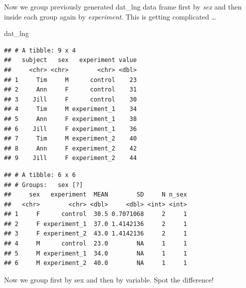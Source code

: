 \documentclass[]{book}
\newenvironment{Shaded}{\begin{snugshade}}{\end{snugshade}}
\newcommand{\KeywordTok}[1]{\textcolor[rgb]{0.13,0.29,0.53}{\textbf{#1}}}
\newcommand{\DataTypeTok}[1]{\textcolor[rgb]{0.13,0.29,0.53}{#1}}
\newcommand{\StringTok}[1]{\textcolor[rgb]{0.31,0.60,0.02}{#1}}
\newcommand{\OperatorTok}[1]{\textcolor[rgb]{0.81,0.36,0.00}{\textbf{#1}}}
\newcommand{\NormalTok}[1]{#1}
\begin{document}
Now we group previously generated dat\_lng data frame first by
\emph{sex} and then inside each group again by \emph{experiment}. This
is getting complicated \ldots{}

\begin{Shaded}
\begin{Highlighting}[]
\NormalTok{dat_lng}
\end{Highlighting}
\end{Shaded}

\begin{verbatim}
## # A tibble: 9 x 4
##   subject   sex   experiment value
##     <chr> <chr>        <chr> <dbl>
## 1     Tim     M      control    23
## 2     Ann     F      control    31
## 3    Jill     F      control    30
## 4     Tim     M experiment_1    34
## 5     Ann     F experiment_1    38
## 6    Jill     F experiment_1    36
## 7     Tim     M experiment_2    40
## 8     Ann     F experiment_2    42
## 9    Jill     F experiment_2    44
\end{verbatim}

\begin{Shaded}
\end{Shaded}

\begin{verbatim}
## # A tibble: 6 x 6
## # Groups:   sex [?]
##     sex   experiment  MEAN        SD     N n_sex
##   <chr>        <chr> <dbl>     <dbl> <int> <int>
## 1     F      control  30.5 0.7071068     2     1
## 2     F experiment_1  37.0 1.4142136     2     1
## 3     F experiment_2  43.0 1.4142136     2     1
## 4     M      control  23.0        NA     1     1
## 5     M experiment_1  34.0        NA     1     1
## 6     M experiment_2  40.0        NA     1     1
\end{verbatim}

Now we group first by sex and then by variable. Spot the difference!

\begin{Shaded}
\end{Shaded}
\end{document}
